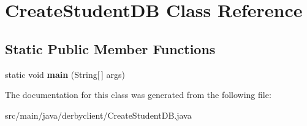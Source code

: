 \hypertarget{classCreateStudentDB}{}\section{Create\+Student\+DB Class Reference}
\label{classCreateStudentDB}
\subsection*{Static Public Member Functions}
\begin{DoxyCompactItemize}
\item 
\mbox{\label{classCreateStudentDB_a3e0aaae2e8c7411e4e5d656f26dd049d}} 
static void {\bfseries main} (String\mbox{[}$\,$\mbox{]} args)
\end{DoxyCompactItemize}


The documentation for this class was generated from the following file\+:\begin{DoxyCompactItemize}
\item 
src/main/java/derbyclient/Create\+Student\+D\+B.\+java\end{DoxyCompactItemize}
